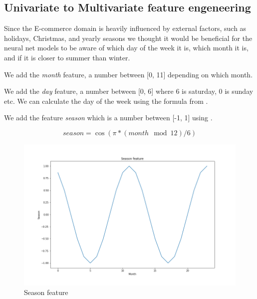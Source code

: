
\subsection{Univariate to Multivariate feature engeneering}
Since the E-commerce domain is heavily influenced by external factors, such as
holidays, Christmas, and yearly seasons we thought it would be beneficial
for the neural net models to be aware of which day of the week it is,
which month it is, and if it is closer to summer than winter.

We add the \textit{month} feature, a number between [0, 11] depending on which month.

We add the \textit{day} feature, a number between [0, 6] where 6 is saturday, 0 is sunday etc.
We can calculate the day of the week using the formula 
from .

We add the feature \textit{season} which is a number between [-1, 1] using .

\begin{equation}
  season = \cos(\pi * (month \mod{12}) / 6)
  \label{eq:season_feature}
\end{equation}

\begin{figure}[h!]
  \centering
  \includegraphics[width=\textwidth]{./figs/code_generated/season_feature.png}
  \hfill
  \caption{Season feature}
  \label{fig:season-feature}
\end{figure}

